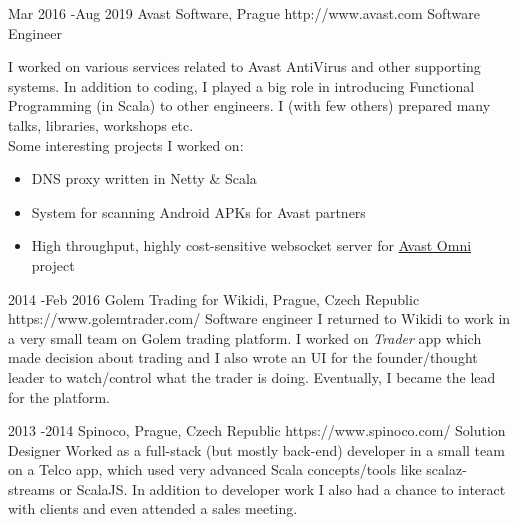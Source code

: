 \documentclass[10pt]{article} %
\begin{document}

    \job
    {Mar 2016 -}{Aug 2019}
    {Avast Software, Prague}
    {http://www.avast.com}
    {Software Engineer}
    {I worked on various services related to Avast AntiVirus and other supporting systems. In addition to coding,
        I played a big role in introducing Functional Programming (in Scala) to other engineers. I (with few others) prepared many talks, libraries, workshops etc. \\ Some interesting projects I worked on:
        \begin{itemize}
            \item DNS proxy written in Netty \& Scala
            \item System for scanning Android APKs for Avast partners
            \item High throughput, highly cost-sensitive websocket server for \href{https://www.avast.com/en-us/omni}{Avast Omni} project
        \end{itemize}

        }


    \job
    {2014 -}{Feb 2016}
    {Golem Trading for Wikidi, Prague, Czech Republic}
    {https://www.golemtrader.com/}
    {Software engineer}
    {I returned to Wikidi to work in a very small team on Golem trading platform. I worked on \emph{Trader} app which made decision about trading and I also wrote an UI for the founder/thought leader to watch/control what the trader is doing. Eventually, I became the lead for the platform. \\
    }


    \job
    {2013 -}{2014 }
    {Spinoco, Prague, Czech Republic}
    {https://www.spinoco.com/}
    {Solution Designer}
    {Worked as a full-stack (but mostly back-end) developer in a small team on a Telco app, which used very advanced Scala concepts/tools like scalaz-streams or ScalaJS. In addition to developer work I also had a chance to interact with clients and even attended a sales meeting.\\
    }
\end{document}
